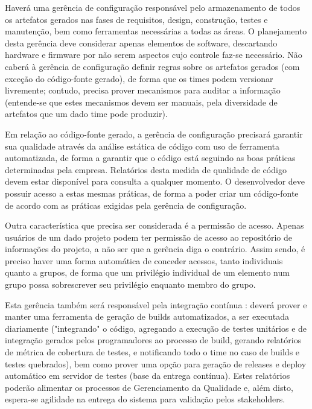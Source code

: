 \documentclass[12pt,journal,compsoc]{IEEEtran}
\begin{document}
Haverá uma gerência de configuração responsável pelo armazenamento de todos os
artefatos gerados nas fases de requisitos, design, construção, testes e
manutenção, bem como ferramentas necessárias a todas as áreas. O planejamento
desta gerência deve considerar apenas elementos de software, descartando
hardware e firmware por não serem aspectos cujo controle faz-se necessário. Não
caberá à gerência de configuração definir regras sobre os artefatos gerados
(com exceção do código-fonte gerado), de forma que os times podem versionar
livremente; contudo, precisa prover mecanismos para auditar a informação
(entende-se que estes mecanismos devem ser manuais, pela diversidade de
artefatos que um dado time pode produzir). 

Em relação ao código-fonte gerado, a gerência de configuração precisará garantir sua qualidade através da análise estática de código com uso de ferramenta automatizada, de forma a garantir que o código está seguindo as boas práticas determinadas pela empresa. Relatórios desta medida de qualidade de código devem estar disponível para consulta a qualquer momento. O desenvolvedor deve possuir acesso a estas mesmas práticas, de forma a poder criar um código-fonte de acordo com as práticas exigidas pela gerência de configuração. 

Outra característica que precisa ser considerada é a permissão de acesso. Apenas usuários de um dado projeto podem ter permissão de acesso ao repositório de informações do projeto, a não ser que a gerência diga o contrário. Assim sendo, é preciso haver uma forma automática de conceder acessos, tanto individuais quanto a grupos, de forma que um privilégio individual de um elemento num grupo possa sobrescrever seu privilégio enquanto membro do grupo.

Esta gerência também será responsável pela integração contínua
\cite{fowler_ci_2006}: deverá prover e manter uma ferramenta de geração de
builds automatizados, a ser executada diariamente ("integrando" o código,
agregando a execução de testes unitários e de integração gerados pelos
programadores ao processo de build, gerando relatórios de métrica de cobertura
de testes, e notificando todo o time no caso de builds e testes quebrados), bem
como prover uma opção para geração de releases e deploy automático em servidor
de testes (base da entrega contínua). Estes relatórios poderão alimentar os
processos de Gerenciamento da Qualidade \cite{society_software_2004} e, além
disto, espera-se agilidade na entrega do sistema para validação pelos
stakeholders. 
\end{document}
